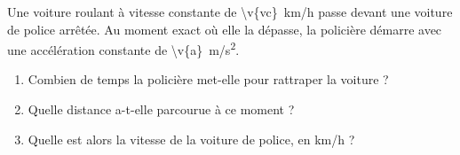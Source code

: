 Une voiture roulant à vitesse constante de \qty{\v{vc}}{km/h} passe devant une voiture de police arrêtée. Au moment exact où elle la dépasse, la policière démarre avec une accélération constante de \qty{\v{a}}{m/s^2}.

\begin{enumerate}[label=\alph*)]
    \item Combien de temps la policière met-elle pour rattraper la voiture ?
    \item Quelle distance a-t-elle parcourue à ce moment ?
    \item Quelle est alors la vitesse de la voiture de police, en km/h ?
\end{enumerate}

